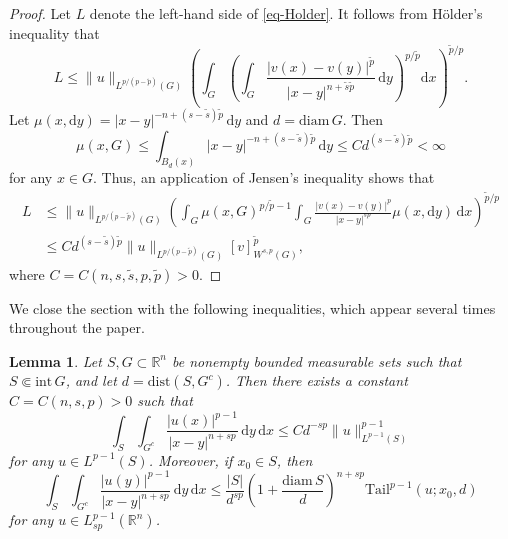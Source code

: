 \documentclass[11pt]{amsart}
\theoremstyle{plain}
\newtheorem{lemma}[theorem]{Lemma}
\theoremstyle{definition}
\numberwithin{equation}{section}
\begin{document}
\begin{proof}
Let $L$ denote the left-hand side of \eqref{eq-Holder}. It follows from H\"older's inequality that
\begin{equation*}
L \leq \|u\|_{L^{p/(p-\tilde{p})}(G)} \left( \int_G \left( \int_G \frac{|v(x)-v(y)|^{\tilde{p}}}{|x-y|^{n+\tilde{s}\tilde{p}}} \,\mathrm{d}y \right)^{p/\tilde{p}} \mathrm{d}x \right)^{\tilde{p}/p}.
\end{equation*}
Let $\mu(x, \mathrm{d}y) = |x-y|^{-n+(s-\tilde{s})\tilde{p}} \,\mathrm{d}y$ and $d=\mathrm{diam}\,G$. Then
\begin{equation*}
\mu(x, G) \leq \int_{B_{d}(x)} |x-y|^{-n+(s-\tilde{s})\tilde{p}} \,\mathrm{d}y \leq C d^{(s-\tilde{s})\tilde{p}}<\infty
\end{equation*}
for any $x \in G$. Thus, an application of Jensen's inequality shows that
\begin{align*}
L
&\leq \|u\|_{L^{p/(p-\tilde{p})}(G)} \left( \int_G \mu(x, G)^{p/\tilde{p}-1} \int_G \frac{|v(x)-v(y)|^{p}}{|x-y|^{sp}} \mu(x, \mathrm{d}y) \,\mathrm{d}x \right)^{\tilde{p}/p} \\
&\leq C d^{(s-\tilde{s})\tilde{p}}\|u\|_{L^{p/(p-\tilde{p})}(G)} [v]_{W^{s, p}(G)}^{\tilde{p}},
\end{align*}
where $C=C(n, s, \tilde{s}, p, \tilde{p})>0$.
\end{proof}

We close the section with the following inequalities, which appear several times throughout the paper.

\begin{lemma}\label{lem-tail}
Let $S, G \subset \mathbb{R}^n$ be nonempty bounded measurable sets such that $S \Subset \mathrm{int}\, G$, and let $d= \mathrm{dist}(S, G^c)$. Then there exists a constant $C=C(n, s, p)>0$ such that
\begin{equation}\label{eq-tail-x}
\int_S \int_{G^c} \frac{|u(x)|^{p-1}}{|x-y|^{n+sp}} \,\mathrm{d}y \,\mathrm{d}x \leq Cd^{-sp} \|u\|_{L^{p-1}(S)}^{p-1}
\end{equation}
for any $u \in L^{p-1}(S)$. Moreover, if $x_0 \in S$, then
\begin{equation*}
\int_S \int_{G^c} \frac{|u(y)|^{p-1}}{|x-y|^{n+sp}} \,\mathrm{d}y \,\mathrm{d}x \leq \frac{|S|}{d^{sp}} \left( 1+\frac{\mathrm{diam}\,S}{d} \right)^{n+sp} \mathrm{Tail}^{p-1}(u; x_0, d)
\end{equation*}
for any $u \in L^{p-1}_{sp}(\mathbb{R}^n)$.
\end{lemma}
\end{document}
